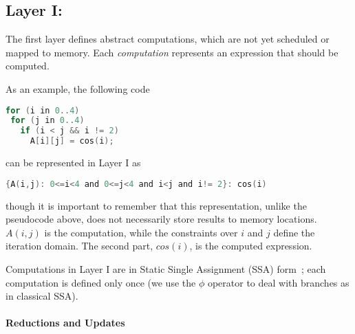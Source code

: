 \vspace{-0.25cm}

\subsection{Layer I: \Layerone}
\label{layer1}

The first layer defines abstract computations, which are not yet scheduled or mapped to memory.
Each \textit{computation} represents an expression that should be computed.  %

As an example, the following code

\begin{lstlisting}[language=C,escapechar=@]
for (i in 0..4)
 for (j in 0..4)
   if (i < j && i != 2)
     A[i][j] = cos(i);
\end{lstlisting}

\noindent can be represented in Layer I as

\begin{lstlisting}[language=C,escapechar=@,numbers=none]
{A(i,j): 0<=i<4 and 0<=j<4 and i<j and i!= 2}: cos(i)
\end{lstlisting}

\noindent though it is important to remember that this representation, unlike the pseudocode above, does not necessarily store results to memory locations.
$A(i,j)$ is the computation, while the constraints over $i$ and $j$ define the iteration domain.  The second part, $cos(i)$, is the computed expression.

Computations in Layer I are in Static Single Assignment (SSA) form~\cite{Cytron:1991:ECS:115372.115320}; each computation is defined only once (we use the $\phi$ operator to deal with branches as in classical SSA).

\paragraph{Reductions and Updates}

